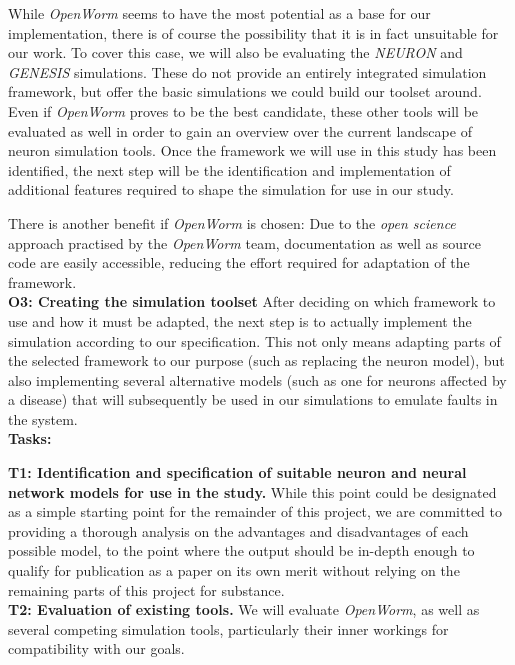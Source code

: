 \documentclass[a4paper,11pt]{article}
\begin{document}
While \emph{OpenWorm} seems to have the most potential as a base for our implementation, there is of course the possibility that it is in fact unsuitable for our work. To cover this case, we will also be evaluating the \emph{NEURON} and \emph{GENESIS} simulations. These do not provide an entirely integrated simulation framework, but offer the basic simulations we could build our toolset around. Even if \emph{OpenWorm} proves to be the best candidate, these other tools will be evaluated as well in order to gain an overview over the current landscape of neuron simulation tools.
Once the framework we will use in this study has been identified, the next step will be the identification and implementation of additional features required to shape the simulation for use in our study.

There is another benefit if \emph{OpenWorm} is chosen: Due to the \emph{open science} approach practised by the \emph{OpenWorm} team, documentation as well as source code are easily accessible, reducing the effort required for adaptation of the framework.
\\[0.2cm]

\textbf{O3: Creating the simulation toolset}
After deciding on which framework to use and how it must be adapted, the next step is to actually implement the simulation according to our specification. This not only means adapting parts of the selected framework to our purpose (such as replacing the neuron model), but also implementing several alternative models (such as one for neurons affected by a disease) that will subsequently be used in our simulations to emulate faults in the system.
\\[0,2cm]


\textbf{Tasks:}

\textbf{T1: Identification and specification of suitable neuron and neural network models for use in the study.}
While this point could be designated as a simple starting point for the remainder of this project, we are committed to providing a thorough analysis on the advantages and disadvantages of each possible model, to the point where the output should be in-depth enough to qualify for publication as a paper on its own merit without relying on the remaining parts of this project for substance.
\\[0,2cm]

\textbf{T2: Evaluation of existing tools.}
We will evaluate \emph{OpenWorm}, as well as several competing simulation tools, particularly their inner workings for compatibility with our goals.
\\[0,2cm]
\end{document}
